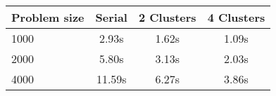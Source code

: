 \centering\begin{tabular}{l*{3}{c}}
\toprule
Problem size & Serial & 2 Clusters & 4 Clusters\\\midrule
1000 &   2.93s &   1.62s &   1.09s \\    
2000 &   5.80s &   3.13s &   2.03s \\    
4000 &  11.59s &   6.27s &   3.86s \\    
\bottomrule
\end{tabular}
